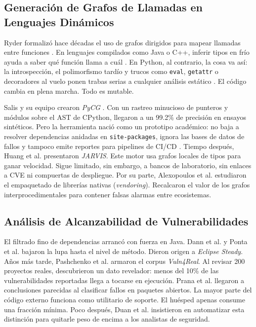 \documentclass[conference]{IEEEtran}
\begin{document}
\subsection{Generación de Grafos de Llamadas en Lenguajes Dinámicos}
Ryder formalizó hace décadas el uso de grafos dirigidos para mapear llamadas entre funciones \cite{ryder1979constructing}. En lenguajes compilados como Java o C++, inferir tipos en frío ayuda a saber qué función llama a cuál \cite{nielson1999principles}. En Python, al contrario, la cosa va así: la introspección, el polimorfismo tardío y trucos como \texttt{eval}, \texttt{getattr} o decoradores al vuelo ponen trabas serias a cualquier análisis estático \cite{salis2021pycg, sotiropoulos2023jarvis, alexopoulos2026cross}. El código cambia en plena marcha. Todo es mutable.

Salis y su equipo crearon \textit{PyCG} \cite{salis2021pycg}. Con un rastreo minucioso de punteros y módulos sobre el AST de CPython, llegaron a un 99.2\% de precisión en ensayos sintéticos. Pero la herramienta nació como un prototipo académico: no baja a resolver dependencias anidadas en \texttt{site-packages}, ignora las bases de datos de fallos y tampoco emite reportes para pipelines de CI/CD \cite{salis2021pycg}. Tiempo después, Huang et al. \cite{sotiropoulos2023jarvis} presentaron \textit{JARVIS}. Este motor usa grafos locales de tipos para ganar velocidad. Sigue limitado, sin embargo, a bancos de laboratorio, sin enlaces a CVE ni compuertas de despliegue. Por su parte, Alexopoulos et al. \cite{alexopoulos2026cross} estudiaron el empaquetado de librerías nativas (\textit{vendoring}). Recalcaron el valor de los grafos interprocedimentales para contener falsas alarmas entre ecosistemas.

\subsection{Análisis de Alcanzabilidad de Vulnerabilidades}
El filtrado fino de dependencias arrancó con fuerza en Java. Dann et al. \cite{dann2021identifying} y Ponta et al. \cite{ponta2020detection} bajaron la lupa hasta el nivel de método. Dieron origen a \textit{Eclipse Steady}. Años más tarde, Pashchenko et al. \cite{pashchenko2022vuln4real} armaron el corpus \textit{Vuln4Real}. Al revisar 200 proyectos reales, descubrieron un dato revelador: menos del 10\% de las vulnerabilidades reportadas llega a tocarse en ejecución. Prana et al. \cite{prana2022empirical} llegaron a conclusiones parecidas al clasificar fallos en paquetes abiertos. La mayor parte del código externo funciona como utilitario de soporte. El huésped apenas consume una fracción mínima. Poco después, Duan et al. \cite{duan2023towards} insistieron en automatizar esta distinción para quitarle peso de encima a los analistas de seguridad.
\end{document}
